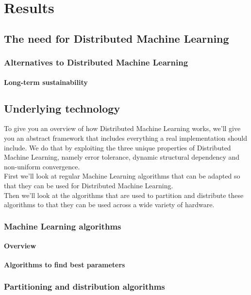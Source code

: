 \section{Results}

\subsection{The need for Distributed Machine Learning}
\subsubsection{Alternatives to Distributed Machine Learning}
\paragraph{Long-term sustainability}










\subsection{Underlying technology}
To give you an overview of how Distributed Machine Learning works, we'll give you an abstract framework that includes everything a real implementation should include. We do that by exploiting the three unique properties of Distributed Machine Learning, namely error tolerance, dynamic structural dependency and non-uniform convergence.\citet{Xing16}\\
First we'll look at regular Machine Learning algorithms that can be adapted so that they can be used for Distributed Machine Learning.\\
Then we'll look at the algorithms that are used to partition and distribute these algorithms to that they can be used across a wide variety of hardware.
\subsubsection{Machine Learning algorithms}
\paragraph{Overview}
\paragraph{Algorithms to find best parameters}
\subsubsection{Partitioning and distribution algorithms}
